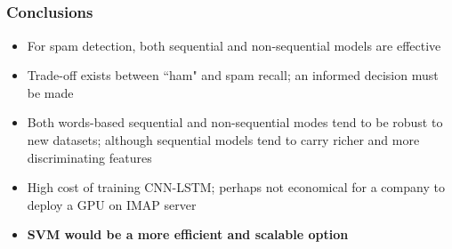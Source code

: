 \documentclass{beamer}
\begin{document}
\subsection{}
\begin{framefont}{\footnotesize}
	\begin{frame}
		\frametitle{Conclusions}
		\begin{itemize}
			\setlength\itemsep{1.2em}
			\item For spam detection, both sequential and non-sequential models are effective
			\item Trade-off exists between ``ham" and spam recall; an informed decision must be made
			\item Both words-based sequential and non-sequential modes tend to be robust to new datasets; although sequential models tend to carry richer and more discriminating features
			\item High cost of training CNN-LSTM; perhaps not economical for a company to deploy a GPU on IMAP server
			\item \textbf{SVM would be a more efficient and scalable option}
		\end{itemize}
	\end{frame}
\end{framefont}
\end{document}
